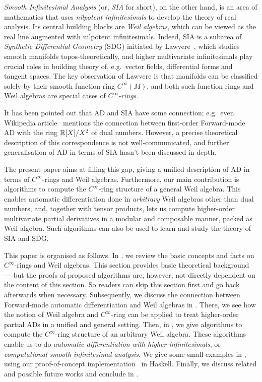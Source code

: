 \emph{Smooth Infinitesimal Analysis} (or, \emph{SIA} for short), on the other hand, is an area of mathematics that uses \emph{nilpotent infinitesimals} to develop the theory of real analysis.
Its central building blocks are \emph{Weil algebras}, which can be viewed as the real line augmented with nilpotent infinitesimals.
Indeed, SIA is a subarea of \emph{Synthetic Differential Geometry} (SDG) initiated by Lawvere~\cite{lawvere1979categorical}, which studies smooth manifolds topos-theoretically, and higher multivariate infinitesimals play crucial roles in building theory of, e.g.\ vector fields, differential forms and tangent spaces.
The key observation of Lawvere is that manifolds can be classified solely by their smooth function ring $C^\infty(M)$, and both such function rings and Weil algebras are special cases of \emph{$C^\infty$-rings}.

It has been pointed out that AD and SIA have some connection; e.g.\ even Wikipedia article~\cite{Wikipedia:2021aa} mentions the connection between first-order Forward-mode AD with the ring $\mathbb{R}[X]/X^2$ of dual numbers.
However, a precise theoretical description of this correspondence is not well-communicated, and further generalisation of AD in terms of SIA hasn't been discussed in depth.

The present paper aims at filling this gap, giving a unified description of AD in terms of $C^\infty$-rings and Weil algebras.
Furthermore, our main contribution is algorithms to compute the $C^\infty$-ring structure of a general Weil algebra.
This enables automatic differentiation done in \emph{arbitrary} Weil algebras other than dual numbers, and, together with tensor products, lets us compute higher-order multivariate partial derivatives in a modular and composable manner, packed as Weil algebra.
Such algorithms can also be used to learn and study the theory of SIA and SDG.

This paper is organised as follows.
In , we review the basic concepts and facts on $C^\infty$-rings and Weil algebras.
This section provides basic theoretical background --- but the proofs of proposed algorithms are, however, not directly dependent on the content of this section.
So readers can skip this section first and go back afterwards when necessary.
Subsequently, we discuss the connection between Forward-mode automatic differentiation and Weil algebras in .
There, we see how the notion of Weil algebra and $C^\infty$-ring can be applied to treat higher-order partial ADs in a unified and general setting.
Then, in , we give algorithms to compute the $C^\infty$-ring structure of an arbitrary Weil algebra. These algorithms enable us to do \emph{automatic differentiation with higher infinitesimals}, or \emph{computational smooth infinitesimal analysis}.
We give some small examples in , using our proof-of-concept implementation~\cite{Ishii:2020aa} in Haskell.
Finally, we discuss related and possible future works and conclude in .

